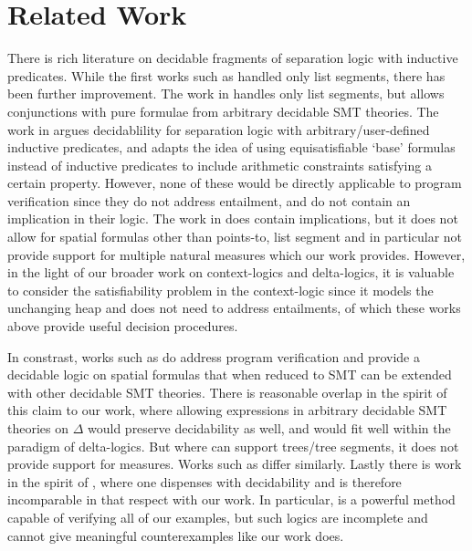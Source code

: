 \section{Related Work}
\label{sec:relwork}
There is rich literature on decidable fragments of separation logic \cite{Reynolds2002} with inductive predicates. While the first works such as  \cite{BerdineCalcagnoOHearn2004, BerdineCalcagnoOHearn2005, CookHaaseChristoph2011,PerezAntonioRybalchenko2011} handled only list segments, there has been further improvement. The work in \cite{PerezRybalchenko2013} handles only list segments, but allows conjunctions with pure formulae from arbitrary decidable SMT theories. The work in \cite{BrotherstonFuhsPerez2014} argues decidablility for separation logic with arbitrary/user-defined inductive predicates, and \cite{LeTatsutaSun2017,LeSunChin2016} adapts the idea of using equisatisfiable `base' formulas instead of inductive predicates to include arithmetic constraints satisfying a certain property. However, none of these would be directly applicable to program verification since they do not address entailment, and do not contain an implication in their logic.  The work in \cite{PerezRybalchenko2013} does contain implications, but it does not allow for spatial formulas other than points-to, list segment and in particular not provide support for multiple natural measures which our work provides. However, in the light of our broader work on context-logics and delta-logics, it is valuable to consider the satisfiability problem in the context-logic since it models the unchanging heap and does not need to address entailments, of which these works above provide useful decision procedures.

In constrast, works such as \cite{PiskacWiesZufferey2014, PiskacWiesZufferey2014Tool} do address program verification and provide a decidable logic on spatial formulas that when reduced to SMT can be extended with other decidable SMT theories. There is reasonable overlap in the spirit of this claim to our work, where allowing expressions in arbitrary decidable SMT theories on $\Delta{}$  would preserve decidability as well, and would fit well within the paradigm of delta-logics. But where \cite{PiskacWiesZufferey2014} can support trees/tree segments, it does not provide support for measures. Works such as\cite{MadhusudanParlatoQiu2011, IosifRogalewiczSimacek2013} differ similarly. %
Lastly there is work in the spirit of \cite{ChinDavidNguyen2007, QiuGargStefanescu2013}, where one dispenses with decidability and is therefore incomparable in that respect with our work. In particular, \cite{QiuGargStefanescu2013} is a powerful method capable of verifying all of our examples, but such logics are incomplete and cannot give meaningful counterexamples like our work does.
